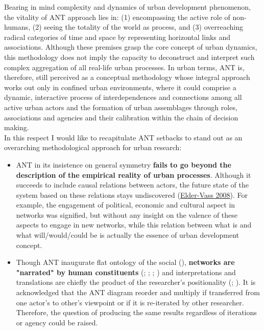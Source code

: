 \documentclass[11pt]{report}
\begin{document}
{Bearing in mind complexity and dynamics of urban development phenomenon, the vitality of ANT approach lies in: (1) encompassing the active role of non-humans, (2) seeing the totality of the world as process, and (3) overreaching radical categories of time and space by representing horizontal links and associations.
Although these premises grasp the core concept of urban dynamics, this methodology does not imply the capacity to deconstruct and interpret such complex aggregation of all real-life urban processes.
In urban terms, ANT is, therefore, still perceived as a conceptual methodology whose integral approach works out only in confined urban environments, where it could comprise a dynamic, interactive process of interdependences and connections among all active urban actors and the formation of urban assemblages through roles, associations and agencies and their calibration within the chain of decision making.
\\
In this respect I would like to recapitulate ANT setbacks to stand out as an overarching methodological approach for urban research:

\begin{itemize}
\item ANT in its insistence on general symmetry \textbf{fails to go beyond the description of the empirical reality of urban processes}. Although it succeeds to include causal relations between actors, the future state of the system based on these relations stays undiscovered (\href{}{Elder-Vass 2008}). For example, the engagement of political, economic and cultural aspect in networks was signified, but without any insight on the valence of these aspects to engage in new networks, while this relation between what is and what will/would/could be is actually the essence of urban development concept.

\item Though ANT inaugurate flat ontology of the social (\cite{Latour 2005}), \textbf{networks are "narrated" by human constituents} (\cite{Collins and Yearley 1992}; \cite{Czarniawska 1997}; \cite{Whittle and Spicer 2008};  \cite{Marshall and Staeheli 2015}) and interpretations and translations are chiefly the product of the researcher’s positionality  (\cite{Rose 1997}; \cite{Ruming 2009}). It is acknowledged that the ANT diagram reorder and multiply if transferred from one actor’s to other’s viewpoint or if it is re-iterated by other researcher. Therefore, the question of producing the same results regardless of iterations or agency could be raised.


\end{itemize}}
\end{document}
